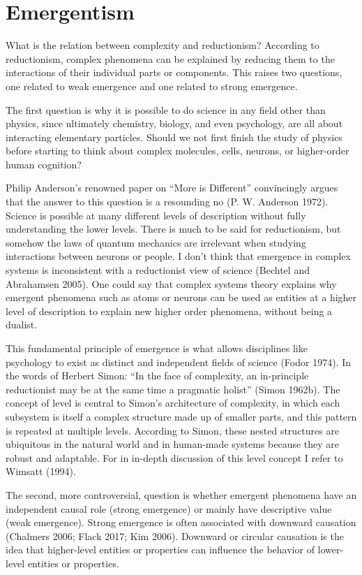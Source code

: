\documentclass[
  a4paper,
  DIV=11,
  numbers=noendperiod,
  oneside]{scrreprt}
\begin{document}
\hypertarget{sec-Emergentism}{%
\section{Emergentism}\label{sec-Emergentism}}

What is the relation between complexity and reductionism? According to
reductionism, complex phenomena can be explained by reducing them to the
interactions of their individual parts or components. This raises two
questions, one related to weak emergence and one related to strong
emergence.

The first question is why it is possible to do science in any field
other than physics, since ultimately chemistry, biology, and even
psychology, are all about interacting elementary particles. Should we
not first finish the study of physics before starting to think about
complex molecules, cells, neurons, or higher-order human cognition?

Philip Anderson's renowned paper on ``More is Different'' convincingly
argues that the answer to this question is a resounding no (P. W.
Anderson 1972). Science is possible at many different levels of
description without fully understanding the lower levels. There is much
to be said for reductionism, but somehow the laws of quantum mechanics
are irrelevant when studying interactions between neurons or people. I
don't think that emergence in complex systems is inconsistent with a
reductionist view of science (Bechtel and Abrahamsen 2005). One could
say that complex systems theory explains why emergent phenomena such as
atoms or neurons can be used as entities at a higher level of
description to explain new higher order phenomena, without being a
dualist.

This fundamental principle of emergence is what allows disciplines like
psychology to exist as distinct and independent fields of science (Fodor
1974). In the words of Herbert Simon: ``In the face of complexity, an
in-principle reductionist may be at the same time a pragmatic holist''
(Simon 1962b). The concept of level is central to Simon's architecture
of complexity, in which each subsystem is itself a complex structure
made up of smaller parts, and this pattern is repeated at multiple
levels. According to Simon, these nested structures are ubiquitous in
the natural world and in human-made systems because they are robust and
adaptable. For in in-depth discussion of this level concept I refer to
Wimsatt (1994).

The second, more controversial, question is whether emergent phenomena
have an independent causal role (strong emergence) or mainly have
descriptive value (weak emergence). Strong emergence is often associated
with downward causation (Chalmers 2006; Flack 2017; Kim 2006). Downward
or circular causation is the idea that higher-level entities or
properties can influence the behavior of lower-level entities or
properties.
\end{document}
